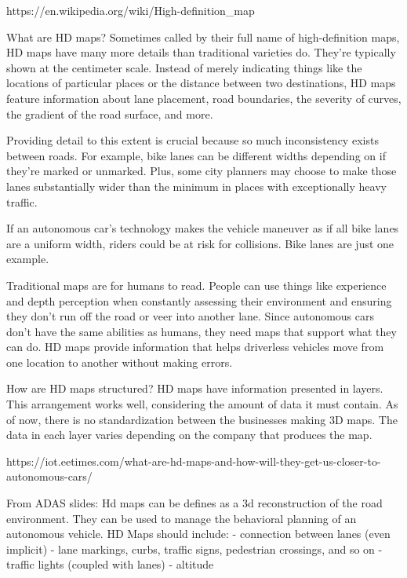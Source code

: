 https://en.wikipedia.org/wiki/High-definition_map





What are HD maps?
Sometimes called by their full name of high-definition maps, HD maps have many more details than traditional varieties do. They’re typically shown at the centimeter scale. Instead of merely indicating things like the locations of particular places or the distance between two destinations, HD maps feature information about lane placement, road boundaries, the severity of curves, the gradient of the road surface, and more.

Providing detail to this extent is crucial because so much inconsistency exists between roads. For example, bike lanes can be different widths depending on if they’re marked or unmarked. Plus, some city planners may choose to make those lanes substantially wider than the minimum in places with exceptionally heavy traffic.

If an autonomous car’s technology makes the vehicle maneuver as if all bike lanes are a uniform width, riders could be at risk for collisions. Bike lanes are just one example.

Traditional maps are for humans to read. People can use things like experience and depth perception when constantly assessing their environment and ensuring they don’t run off the road or veer into another lane. Since autonomous cars don’t have the same abilities as humans, they need maps that support what they can do. HD maps provide information that helps driverless vehicles move from one location to another without making errors.

How are HD maps structured?
HD maps have information presented in layers. This arrangement works well, considering the amount of data it must contain. As of now, there is no standardization between the businesses making 3D maps. The data in each layer varies depending on the company that produces the map.

https://iot.eetimes.com/what-are-hd-maps-and-how-will-they-get-us-closer-to-autonomous-cars/



From ADAS slides:
Hd maps can be defines as a 3d reconstruction of the road environment. They can be used to manage the behavioral planning of an autonomous vehicle. 
HD Maps should include:
- connection between lanes (even implicit)
- lane markings, curbs, traffic signs, pedestrian crossings, and so on 
- traffic lights (coupled with lanes)  
- altitude 

